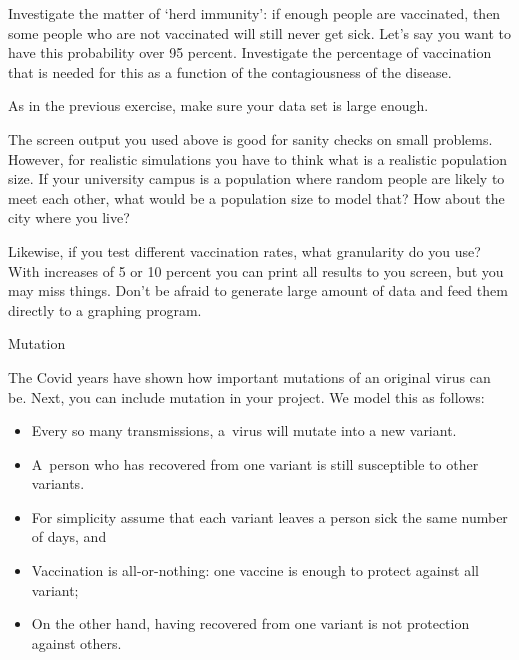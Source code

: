 \begin{exercise}
  Investigate the matter of `herd immunity': if enough people are
  vaccinated, then some people who are not vaccinated will still never get
  sick. Let's say you want to have this probability over 95
  percent. Investigate the percentage of vaccination that is needed
  for this as a function of the contagiousness of the disease.

  As in the previous exercise, make sure your data set is large enough.
\end{exercise}

\begin{remark}
  The screen output you used above is good for sanity checks on small problems.
  However, for realistic simulations you have to think what is a realistic population size.
  If your university campus is a population where random people are likely to meet each other,
  what would be a population size to model that? How about the city where you live?

  Likewise, if you test different vaccination rates, what granularity do you use?
  With increases of 5 or 10 percent you can print all results to you screen,
  but you may miss things. Don't be afraid to generate large amount of data
  and feed them directly to a graphing program.
\end{remark}

 {Mutation}

The Covid years have shown how important mutations of an original virus can be.
Next, you can include mutation in your project. We model this as follows:
\begin{itemize}
\item Every so many transmissions, a~virus will mutate into a new variant.
\item A~person who has recovered from one variant is still susceptible to other variants.
\item For simplicity assume that each variant leaves a person sick the same number of days, and
\item Vaccination is all-or-nothing: one vaccine is enough to protect against all variant;
\item On the other hand, having recovered from one variant is not protection against others.
\end{itemize}

